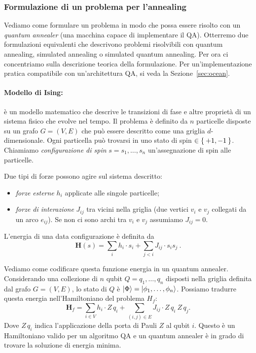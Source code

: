 \subsubsection*{Formulazione di un problema per l'annealing}
\label{sec:annealing_form}
Vediamo come formulare un problema in modo che possa essere risolto con un \emph{quantum annealer} (una macchina capace di implementare il QA). Otterremo due formulazioni equivalenti che descrivono problemi risolvibili con quantum annealing, simulated annealing o simulated quantum annealing. Per ora ci concentriamo sulla descrizione teorica della formulazione. Per un'implementazione pratica compatibile con un'architettura QA, si veda la Sezione~\ref{sec:ocean}.

\paragraph{Modello di Ising:} è un modello matematico che descrive le transizioni di fase e altre proprietà di un sistema fisico che evolve nel tempo. Il problema è definito da $n$ particelle disposte su un grafo $G = (V, E)$ che può essere descritto come una griglia $d$-dimensionale. Ogni particella può trovarsi in uno stato di spin $\in \Set{+1, -1}$. Chiamiamo \emph{configurazione di spin} $s = s_1,\dots, s_n$ un'assegnazione di spin alle particelle.

Due tipi di forze possono agire sul sistema descritto:
\begin{itemize}
	\item \emph{forze esterne} $h_i$ applicate alle singole particelle;
	\item \emph{forze di interazione} $J_{ij}$ tra vicini nella griglia (due vertici $v_i$ e $v_j$ collegati da un arco $e_{ij}$). Se non ci sono archi tra $v_i$ e $v_j$ assumiamo $J_{ij} = 0$.
\end{itemize}

L'energia di una data configurazione è definita da
\begin{equation}
	\mathbf{H}(s) =  \sum_{i}h_i\cdot s_i + \sum_{j < i} J_{ij}\cdot s_i s_j \ .
	\label{eqn:ising}
\end{equation}

Vediamo come codificare questa funzione energia in un quantum annealer. Considerando una collezione di $n$ qubit $Q = q_1,\dots, q_n$ disposti nella griglia definita dal grafo $G = (V, E)$, lo stato di $Q$ è $\Ket{\Phi} = \Ket{\phi_1, \dots, \phi_n}$. Possiamo tradurre questa energia nell'Hamiltoniano del problema $H_f$:
\begin{equation}
	\mathbf{H}_f =  \sum_{i\in V}h_i\cdot Z\,q_i + \sum_{(i,j) \in E} J_{ij}\cdot Z\,q_i\ Z\,q_j.
\end{equation}
Dove $Z\,q_i$ indica l'applicazione della porta di Pauli $Z$ al qubit $i$. Questo è un Hamiltoniano valido per un algoritmo QA e un quantum annealer è in grado di trovare la soluzione di energia minima.

